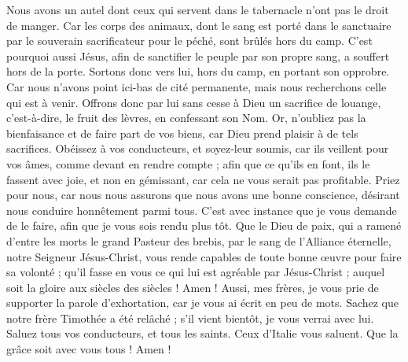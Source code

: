 \begin{multicols}{2}
Nous avons un autel dont ceux qui servent dans le tabernacle n'ont pas le droit de manger.
Car les corps des animaux, dont le sang est porté dans le sanctuaire par le souverain sacrificateur pour le péché, sont brûlés hors du camp.
C'est pourquoi aussi Jésus, afin de sanctifier le peuple par son propre sang, a souffert hors de la porte.
Sortons donc vers lui, hors du camp, en portant son opprobre.
Car nous n'avons point ici-bas de cité permanente, mais nous recherchons celle qui est à venir.
Offrons donc par lui sans cesse à Dieu un sacrifice de louange, c'est-à-dire, le fruit des lèvres, en confessant son Nom.
Or, n'oubliez pas la bienfaisance et de faire part de vos biens, car Dieu prend plaisir à de tels sacrifices.
Obéissez à vos conducteurs, et soyez-leur soumis, car ils veillent pour vos âmes, comme devant en rendre compte ; afin que ce qu'ils en font, ils le fassent avec joie, et non en gémissant, car cela ne vous serait pas profitable.
 Priez pour nous, car nous nous assurons que nous avons une bonne conscience, désirant nous conduire honnêtement parmi tous.
C'est avec instance que je vous demande de le faire, afin que je vous sois rendu plus tôt.
Que le Dieu de paix, qui a ramené d'entre les morts le grand Pasteur des brebis, par le sang de l'Alliance éternelle, notre Seigneur Jésus-Christ,
vous rende capables de toute bonne œuvre pour faire sa volonté ; qu'il fasse en vous ce qui lui est agréable par Jésus-Christ ; auquel soit la gloire aux siècles des siècles ! Amen !
Aussi, mes frères, je vous prie de supporter la parole d'exhortation, car je vous ai écrit en peu de mots.
Sachez que notre frère Timothée a été relâché ; s'il vient bientôt, je vous verrai avec lui.
Saluez tous vos conducteurs, et tous les saints. Ceux d'Italie vous saluent.
Que la grâce soit avec vous tous ! Amen !
\PPE{}
\end{multicols}

